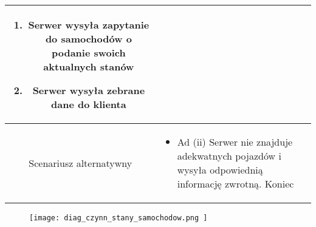 \documentclass{article}
\begin{document}
\begin{enumerate}
\begin{enumerate}
\begin{table}[H]
\begin{tabular}{|c|p{7cm}|}
\begin{enumerate}
\item Serwer wysyła zapytanie do samochodów o podanie swoich aktualnych stanów

\item Serwer wysyła zebrane dane do klienta\end{enumerate} \\
						\hline
						Scenariusz alternatywny & \begin{itemize}\item Ad (ii) Serwer nie znajduje adekwatnych pojazdów i wysyła odpowiednią informację zwrotną. Koniec\end{itemize}                                                                                                               \\
						\hline
					\end{tabular}
				\end{table}

				\begin{figure}[h]
					\centering
					\texttt{[image: 
						diag\_czynn\_stany\_samochodow.png
					]}
				\end{figure}


\end{enumerate}
\end{enumerate}
\end{document}
